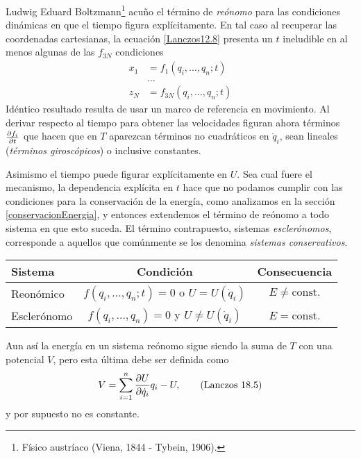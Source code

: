 \documentclass[12pt, spanish, a4paper, ]{article}
\begin{document}
Ludwig Eduard Boltzmann\footnote{Físico austríaco (Viena, 1844 - Tybein, 1906).} acuño el término de \emph{reónomo} para las condiciones dinámicas en que el tiempo figura explícitamente.
En tal caso al recuperar las coordenadas cartesianas, la ecuación \eqref{Lanczos12.8} presenta un \(t\) ineludible en al menos algunas de las \(f_{3N}\) condiciones
\begin{equation}\label{Lanczos18.3}
	\begin{aligned}
		x_1 &= f_1(q_i, \ldots, q_n; t) \\
		& \ldots \\
		z_N &= f_{3N}(q_i, \ldots, q_n; t)
	\end{aligned}
	\tag{Lanczos 18.3}
\end{equation}
Idéntico resultado resulta de usar un marco de referencia en movimiento.
Al derivar respecto al tiempo para obtener las velocidades figuran ahora términos \(\pdv{f_i}{t}\) que hacen que en \(T\) aparezcan términos no cuadráticos en \(\dot{q}_i\), sean lineales (\emph{términos giroscópicos}) o inclusive constantes.

Asimismo el tiempo puede figurar explícitamente en \(U\).
Sea cual fuere el mecanismo, la dependencia explícita en \(t\) hace que no podamos cumplir con las condiciones para la conservación de la energía, como analizamos en la sección \ref{conservacionEnergia}, y entonces extendemos el término de reónomo a todo sistema en que esto suceda.
El término contrapuesto, sistemas \emph{esclerónomos}, corresponde a aquellos que comúnmente se los denomina \emph{sistemas conservativos}.

\begin{center}
  \begin{tabular}{lcc}
    \toprule
	Sistema & Condición & Consecuencia\\
	\midrule
	Reonómico & \(f(q_i,\ldots,q_n;t)= 0\) o \(U=U(\dot{q}_i)\) & \(E \neq \mathrm{const.}\) \\
	Esclerónomo & \(f(q_i,\ldots,q_n)= 0\) y \(U\neq U(\dot{q}_i)\)  & \(E =\mathrm{const.}\) \\
    \bottomrule
  \end{tabular}
\end{center}

Aun así la energía en un sistema reónomo sigue siendo la suma de \(T\) con una potencial \(V\), pero esta última debe ser definida como
\begin{equation}\label{Lanczos18.5}
	V= \sum_{i=1}^n \pdv{U}{\dot{q}_i} q_i - U ,
	\tag{Lanczos 18.5}
\end{equation} 
y por supuesto no es constante.
\end{document}
